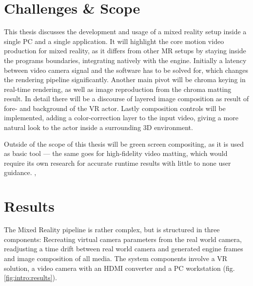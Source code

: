 \section{Challenges \& Scope}
\label{sec:intro:challenges}

This thesis discusses the development and usage of a mixed reality setup inside 
a single PC and a single application.
\newline
It will highlight the core motion video production for mixed reality, as it 
differs from other MR setups by staying inside the programs boundaries, 
integrating natively with the engine. Initially a latency between video camera 
signal and the software has to be solved for, which changes the rendering 
pipeline significantly.
\newline
Another main pivot will be chroma keying in real-time rendering, as well as 
image reproduction from the chroma matting result. In detail there will be a 
discourse of layered image composition as result of fore- and background of the 
VR actor.
\newline
Lastly composition controls will be implemented, adding a color-correction 
layer to the input video, giving a more natural look to the actor inside a 
surrounding 3D environment.

Outside of the scope of this thesis will be green screen compositing, as it is 
used as basic tool --- the same goes for high-fidelity video matting, which 
would require its own research for accurate runtime results with little to none 
user guidance. 
\cite{gong:realtime-matting:2010}, \cite{gastal:shared-sampling:2010}

\section{Results}

The Mixed Reality pipeline is rather complex, but is structured in three 
components: Recreating virtual camera parameters from the real world camera, 
readjusting a time drift between real world camera and generated engine frames 
and image composition of all media. The system components involve a VR 
solution, a video camera with an HDMI converter and a PC workstation (fig. 
\ref{fig:intro:results}).

